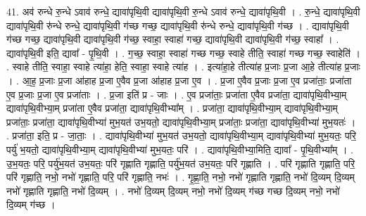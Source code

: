 \documentclass[17pt]{extarticle}
\begin{document}
41. अव॑ रुन्धे रु॒न्धे ऽवाव॑ रुन्धे॒ द्यावा॑पृथि॒वी द्यावा॑पृथि॒वी रु॒न्धे ऽवाव॑ रुन्धे॒ द्यावा॑पृथि॒वी । . रु॒न्धे॒ द्यावा॑पृथि॒वी द्यावा॑पृथि॒वी रु॑न्धे रुन्धे॒ द्यावा॑पृथि॒वी ग॑च्छ गच्छ॒ द्यावा॑पृथि॒वी रु॑न्धे रुन्धे॒ द्यावा॑पृथि॒वी ग॑च्छ । . द्यावा॑पृथि॒वी ग॑च्छ गच्छ॒ द्यावा॑पृथि॒वी द्यावा॑पृथि॒वी ग॑च्छ॒ स्वाहा॒ स्वाहा॑ गच्छ॒ द्यावा॑पृथि॒वी द्यावा॑पृथि॒वी ग॑च्छ॒ स्वाहा᳚ । . द्यावा॑पृथि॒वी इति॒ द्यावा᳚ - पृ॒थि॒वी । . ग॒च्छ॒ स्वाहा॒ स्वाहा॑ गच्छ गच्छ॒ स्वाहे तीति॒ स्वाहा॑ गच्छ गच्छ॒ स्वाहेति॑ । . स्वाहे तीति॒ स्वाहा॒ स्वाहे त्या॑हा॒ हेति॒ स्वाहा॒ स्वाहे त्या॑ह । . इत्या॑हा॒हे तीत्या॑ह प्र॒जाः प्र॒जा आ॒हे तीत्या॑ह प्र॒जाः । . आ॒ह॒ प्र॒जाः प्र॒जा आ॑हाह प्र॒जा ए॒वैव प्र॒जा आ॑हाह प्र॒जा ए॒व । . प्र॒जा ए॒वैव प्र॒जाः प्र॒जा ए॒व प्रजा॑ताः॒ प्रजा॑ता ए॒व प्र॒जाः प्र॒जा ए॒व प्रजा॑ताः । . प्र॒जा इति॑ प्र - जाः । . ए॒व प्रजा॑ताः॒ प्रजा॑ता ए॒वैव प्रजा॑ता॒ द्यावा॑पृथि॒वीभ्या॒म् द्यावा॑पृथि॒वीभ्या॒म् प्रजा॑ता ए॒वैव प्रजा॑ता॒ द्यावा॑पृथि॒वीभ्या᳚म् । . प्रजा॑ता॒ द्यावा॑पृथि॒वीभ्या॒म् द्यावा॑पृथि॒वीभ्या॒म् प्रजा॑ताः॒ प्रजा॑ता॒ द्यावा॑पृथि॒वीभ्या॑ मुभ॒यत॑ उभ॒यतो॒ द्यावा॑पृथि॒वीभ्या॒म् प्रजा॑ताः॒ प्रजा॑ता॒ द्यावा॑पृथि॒वीभ्या॑ मुभ॒यतः॑ । . प्रजा॑ता॒ इति॒ प्र - जा॒ताः॒ । . द्यावा॑पृथि॒वीभ्या॑ मुभ॒यत॑ उभ॒यतो॒ द्यावा॑पृथि॒वीभ्या॒म् द्यावा॑पृथि॒वीभ्या॑ मुभ॒यतः॒ परि॒ पर्यु॑ भ॒यतो॒ द्यावा॑पृथि॒वीभ्या॒म् द्यावा॑पृथि॒वीभ्या॑ मुभ॒यतः॒ परि॑ । . द्यावा॑पृथि॒वीभ्या॒मिति॒ द्यावा᳚ - पृ॒थि॒वीभ्या᳚म् । . उ॒भ॒यतः॒ परि॒ पर्यु॑भ॒यत॑ उभ॒यतः॒ परि॑ गृह्णाति गृह्णाति॒ पर्यु॑भ॒यत॑ उभ॒यतः॒ परि॑ गृह्णाति । . परि॑ गृह्णाति गृह्णाति॒ परि॒ परि॑ गृह्णाति॒ नभो॒ नभो॑ गृह्णाति॒ परि॒ परि॑ गृह्णाति॒ नभः॑ । . गृ॒ह्णा॒ति॒ नभो॒ नभो॑ गृह्णाति गृह्णाति॒ नभो॑ दि॒व्यम् दि॒व्यम् नभो॑ गृह्णाति गृह्णाति॒ नभो॑ दि॒व्यम् । . नभो॑ दि॒व्यम् दि॒व्यम् नभो॒ नभो॑ दि॒व्यम् ग॑च्छ गच्छ दि॒व्यम् नभो॒ नभो॑ दि॒व्यम् ग॑च्छ । \newline
\pagebreak
{}
\end{document}
